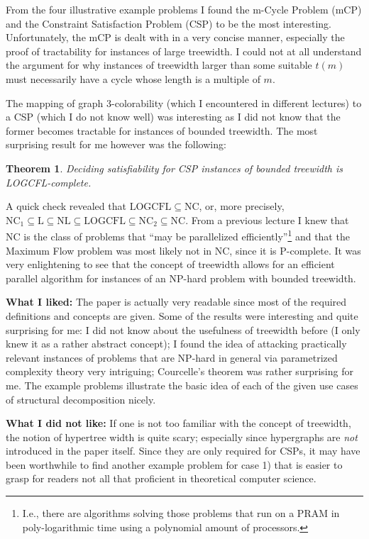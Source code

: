 \documentclass [11pt]{article}
\newtheorem{theorem}{Theorem}
\begin{document}
From the four illustrative example problems I found the m-Cycle Problem (mCP) and the Constraint Satisfaction Problem (CSP) to be the most interesting. 
Unfortunately, the mCP is dealt with in a very concise manner, especially the proof of tractability for instances of large treewidth. 
I could not at all understand the argument for why instances of treewidth larger than some suitable $t(m)$ must necessarily have a cycle whose length is a multiple of $m$.

The mapping of graph 3-colorability (which I encountered in different lectures) to a CSP (which I do not know well) was interesting as I did not know that the former becomes tractable for instances of bounded treewidth. The most surprising result for me however was the following:

\begin{theorem}
 Deciding satisfiability for CSP instances of bounded treewidth is \emph{LOGCFL}-complete.
\end{theorem}
A quick check revealed that $\mathrm{LOGCFL} \subseteq \mathrm{NC}$, or, more precisely, $\mathrm{NC_1} \subseteq \mathrm{L} \subseteq \mathrm{NL} \subseteq \mathrm{LOGCFL} \subseteq \mathrm{NC_2} \subseteq \mathrm{NC}$. From a previous lecture I knew that NC is the class of problems that ``may be parallelized efficiently''\footnote{I.e., there are algorithms solving those problems that run on a PRAM in poly-logarithmic time using a polynomial amount of processors.} and that the Maximum Flow problem was most likely not in NC, since it is P-complete. It was very enlightening to see that the concept of treewidth allows for an efficient parallel algorithm for instances of an NP-hard problem with bounded treewidth.

\bigskip
\textbf{What I liked:} The paper is actually very readable since most of the required definitions and concepts are given. Some of the results were interesting and quite surprising for me: I did not know about the usefulness of treewidth before (I only knew it as a rather abstract concept); I found the idea of attacking practically relevant instances of problems that are NP-hard in general via parametrized complexity theory very intriguing; Courcelle's theorem was rather surprising for me. The example problems illustrate the basic idea of each of the given use cases of structural decomposition nicely.

\textbf{What I did not like:} If one is not too familiar with the concept of treewidth, the notion of hypertree width is quite scary; especially since hypergraphs are \emph{not} introduced in the paper itself. Since they are only required for CSPs, it may have been worthwhile to find another example problem for case 1) that is easier to grasp for readers not all that proficient in theoretical  computer science.
\end{document}
